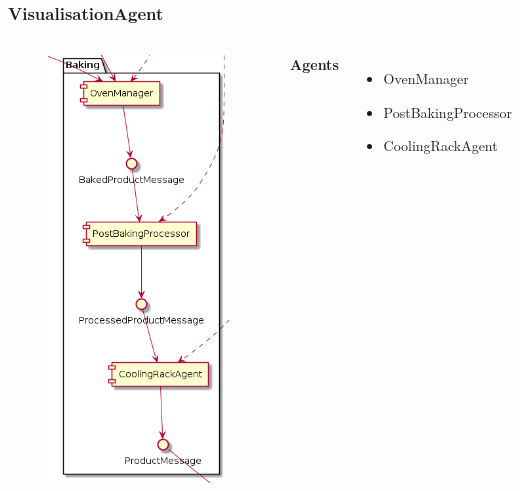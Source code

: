 \documentclass{beamer}
\begin{document}
\begin{frame}
    \frametitle{\huge{VisualisationAgent}}
    \begin{columns}[t]
        \begin{figure}[H]
            \centering
            \includegraphics[width=0.6\linewidth]{baking_component_diagram.png}
        \end{figure}
            \textbf{Agents}
            \begin{itemize}
                \item OvenManager
                \item PostBakingProcessor
                \item CoolingRackAgent
            \end{itemize}
    \end{columns}
\end{frame}
\end{document}
